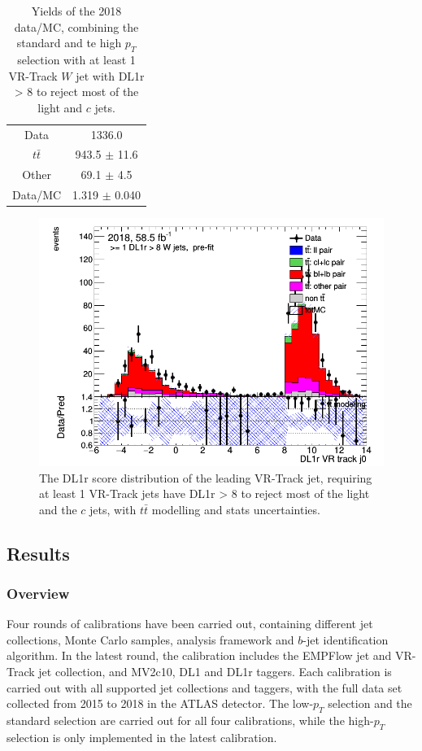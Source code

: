 \documentclass[letterpaper,12pt]{article}
\begin{document}
\begin{table}[]
    \centering
    \begin{tabular}{c|c}
        Data & 1336.0 \\
         $t\bar{t}$ & 943.5 $\pm$ 11.6 \\
         Other & 69.1 $\pm$ 4.5 \\
         Data/MC & 1.319 $\pm$ 0.040 \\
    \end{tabular}
    \caption{Yields of the 2018 data/MC, combining the standard and te high $p_T$ selection with at least 1 VR-Track $W$ jet with DL1r > 8 to reject most of the light and $c$ jets.}
    \label{tab:3byields2}
\end{table}

\begin{figure}
    \centering
    \begin{minipage}[b]{.45\textwidth}
\centering
\includegraphics[width=1\textwidth]{3bplots/3bplots.png}
\end{minipage}
    \caption{The DL1r score distribution of the leading VR-Track jet, requiring at least 1 VR-Track jets have DL1r > 8 to reject most of the light and the $c$ jets, with $t\bar{t}$ modelling and stats uncertainties. }
    \label{fig:3bplots}
\end{figure}


\subsection{Results}
\label{result}


\subsubsection{Overview}
Four rounds of calibrations have been carried out, containing different jet collections, Monte Carlo samples, analysis framework and $b$-jet identification algorithm. In the latest round, the calibration includes the EMPFlow jet and VR-Track jet collection, and MV2c10, DL1 and DL1r taggers. Each calibration is carried out with all supported jet collections and taggers, with the full data set collected from 2015 to 2018 in the ATLAS detector. The low-$p_T$ selection and the standard selection are carried out for all four calibrations, while the high-$p_T$ selection is only implemented in the latest calibration. 
\end{document}
